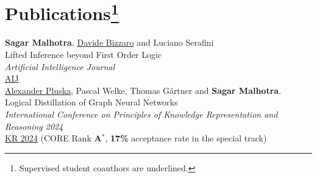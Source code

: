 \documentclass[10pt, a4paper]{article}
\newcommand{\years}[1]{\marginnote{\scriptsize #1}}
\begin{document}
\section*{Publications\protect\footnote{Supervised student coauthors are underlined.}}

\years{2025}\textbf{Sagar Malhotra}, \underline{Davide Bizzaro} and Luciano Serafini\\
Lifted Inference beyond First Order Logic \\
\emph{Artificial Intelligence Journal}\\
\href{https://doi.org/10.1016/j.artint.2025.104310}{AIJ}\\ 

\years{2024}\underline{Alexander Pluska}, Pascal Welke, Thomas G{\"a}rtner and \textbf{Sagar Malhotra}.\\
Logical Distillation of Graph Neural Networks\\
\emph{International Conference on Principles of Knowledge Representation and Reasoning 2024} \\
\href{https://arxiv.org/abs/2406.07126}{KR 2024} (CORE Rank \textbf{A$^{*}$}, \textbf{17\%} acceptance rate in the special track)\\
\end{document}
